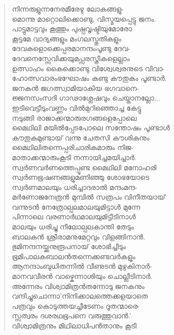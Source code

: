 \begin{verse}
നിന്നരുളുന്നനേരമീരേഴു ലോകങ്ങളു-\\
മൊന്നു മാറ്റൊലിക്കൊണ്ടു, വിസ്മയപ്പെട്ടു ജനം.\\
പാട്ടുമാട്ടവും കൂത്തും പുഷ്പവൃഷ്ടിയുമോരോ\\
കൂട്ടമേ വാദ്യങ്ങളും മംഗലസ്തുതികളും\\
ദേവകളൊക്കെപ്പരമാനന്ദംപൂണ്ടു ദേവ-\\
ദേവനെസ്സേവിക്കയുമപ്സരസ്ത്രീകളെല്ലാം\\
ഉത്സാഹം കൈക്കൊണ്ടു വിശ്വേശ്വരനുടെ വിവാ-\\
ഹോത്സവാരംഭഘോഷം കണ്ടു കൗതുകം പൂണ്ടാര്‍.\\
ജനകന്‍ ജഗത്സ്വാമിയാകിയ ഭഗവാനെ-\\
ജ്ജനസംസദി ഗാഢാശ്ലേഷവും ചെയ്താനല്ലോ...\\
ഇടിവെട്ടീടുംവണ്ണം വില്‍മുറിഞ്ഞൊച്ച കേട്ടു\\
നടുങ്ങി രാജാക്കന്മാരുരഗങ്ങളെപ്പോലെ\\
മൈഥിലി മയില്‍പ്പേടപോലെ സന്തോഷം പൂണ്ടാള്‍\\
കൗതുകമുണ്ടായ് വന്നു ചേതസി കൗശികനും\\
മൈഥിലിതന്നെപ്പരിചാരികമാരും നിജ-\\
മാതാക്കന്മാരുംകൂടി നന്നായിച്ചമയിച്ചാര്‍.\\
സ്വര്‍ണവര്‍ണത്തെപ്പൂണ്ട മൈഥിലി മനോഹരി\\
സ്വര്‍ണഭൂഷണങ്ങളുമണിഞ്ഞു ശോഭയോടെ\\
സ്വര്‍ണമാലയും ധരിച്ചാദരാല്‍ മന്ദംമന്ദ-\\
മര്‍ണോജനേത്രന്‍ മുമ്പില്‍ സത്രപം വിനീതയായ്\\
വന്നുടന്‍ നേത്രോല്പലമാലയുമിട്ടാള്‍ മുന്നേ\\
പിന്നാലെ വരണാര്‍ഥമാലയുമിട്ടീടിനാള്‍\\
മാലയും ധരിച്ചു നീലോല്പലകാന്തി തേടും\\
ബാലകന്‍ ശ്രീരാമനുമേറ്റവും വിളങ്ങിനാന്‍.\\
ഭുമിനന്ദനയ്ക്കനുരൂപനായ് ശോഭിച്ചീടും\\
ഭൂമിപാലകബാലന്‍തന്നെക്കണ്ടവര്‍കളും\\
ആനന്ദാംബുധിതന്നില്‍ വീണുടന്‍ മുഴുകിനാര്‍-\\
മാനവവീരന്‍ വാഴ്കെന്നാശിയും ചൊല്ലീടിനാര്‍.\\
അന്നേരം വിശ്വാമിത്രന്‍തന്നോടു ജനകനും\\
വന്ദിച്ചുചൊന്നാ’നിനിക്കാലത്തെക്കളയാതെ\\
പത്രവും കൊടുത്തയച്ചീടേണം ദൂതന്മാരെ-\\
സ്സത്വരം ദശരഥഭൂപനെ വരുത്തുവാന്‍.’\\
വിശ്വാമിത്രനും മിഥിലാധിപന്‍താനും കൂടി\\

\end{verse}
